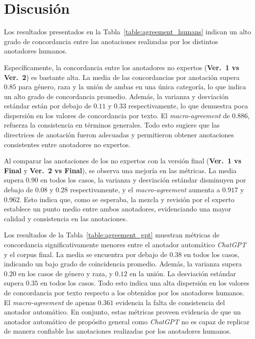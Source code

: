 \section{Discusi\'on}
Los resultados presentados en la Tabla~\ref{table:agreement_humans} indican un alto grado de concordancia entre las 
anotaciones realizadas por los distintos anotadores humanos.

Espec\'ificamente, la concordancia entre los anotadores no expertos (\textbf{Ver.~1 vs Ver.~2}) es bastante alta. La
media de las concordancias por anotaci\'on supera $0.85$ para g\'enero, raza y la uni\'on de ambas en una \'unica categor\'ia,
lo que indica un alto grado de concordancia promedio. Adem\'as, la varianza y desviaci\'on est\'andar est\'an por debajo de 
$0.11$ y $0.33$ respectivamente, lo que demuestra poca dispersi\'on en los valores de concordancia por texto. El
\emph{macro-agreement} de $0.886$, refuerza la consistencia en t\'erminos generales. Todo esto sugiere que las directrices 
de anotaci\'on fueron adecuadas y permitieron obtener anotaciones consistentes entre anotadores no expertos.

Al comparar las anotaciones de los no expertos con la versi\'on final (\textbf{Ver.~1 vs Final} y \textbf{Ver.~2 vs Final}), se
observa una mejor\'ia en las m\'etricas. La media supera $0.90$ en todos los casos, la varianza y desviaci\'on est\'andar
disminuyen por debajo de $0.08$ y $0.28$ respectivamente, y el \emph{macro-agreement} aumenta a $0.917$ y 
$0.962$. Esto indica que, como se esperaba, la mezcla y revisi\'on por el experto establece un 
punto medio entre ambos anotadores, evidenciando una mayor calidad y consistencia en las anotaciones.

Los resultados de la Tabla~\ref{table:agreement_gpt} muestran m\'etricas de concordancia significativamente menores entre 
el anotador autom\'atico \emph{ChatGPT} y el corpus final. La media se encuentra por debajo de $0.38$ en todos los casos,
indicando un bajo grado de coincidencia promedio. Adem\'as, la varianza supera $0.20$ en los casos de g\'enero y raza, y 
$0.12$ en la uni\'on. La desviaci\'on est\'andar supera $0.35$ en todos los casos. Todo esto indica una alta 
dispersi\'on en los valores de concordancia por texto respecto a los obtenidos por los anotadores humanos. El 
\emph{macro-agreement} de apenas $0.361$ evidencia la falta de consistencia del anotador autom\'atico. En conjunto, estas
m\'etricas proveen evidencia de que un anotador autom\'atico de prop\'osito general como \emph{ChatGPT} no es capaz de replicar
de manera confiable las anotaciones realizadas por los anotadores humanos.  

